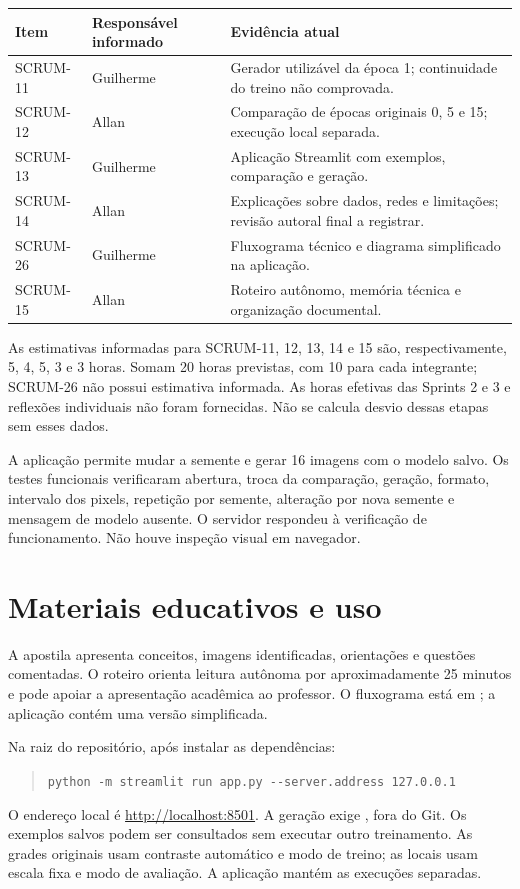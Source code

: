 \documentclass[12pt,a4paper]{article}
\begin{document}
\begin{center}
\small
\begin{tabularx}{\textwidth}{@{}lYY@{}}
\toprule
\textbf{Item} & \textbf{Responsável informado} & \textbf{Evidência atual} \\
\midrule
SCRUM-11 & Guilherme & Gerador utilizável da época 1; continuidade do treino não comprovada. \\
SCRUM-12 & Allan & Comparação de épocas originais 0, 5 e 15; execução local separada. \\
SCRUM-13 & Guilherme & Aplicação Streamlit com exemplos, comparação e geração. \\
SCRUM-14 & Allan & Explicações sobre dados, redes e limitações; revisão autoral final a registrar. \\
SCRUM-26 & Guilherme & Fluxograma técnico e diagrama simplificado na aplicação. \\
SCRUM-15 & Allan & Roteiro autônomo, memória técnica e organização documental. \\
\bottomrule
\end{tabularx}
\end{center}

As estimativas informadas para SCRUM-11, 12, 13, 14 e 15 são, respectivamente, 5, 4, 5, 3 e 3 horas. Somam 20 horas previstas, com 10 para cada integrante; SCRUM-26 não possui estimativa informada. As horas efetivas das Sprints 2 e 3 e reflexões individuais não foram fornecidas. Não se calcula desvio dessas etapas sem esses dados.

A aplicação permite mudar a semente e gerar 16 imagens com o modelo salvo. Os testes funcionais verificaram abertura, troca da comparação, geração, formato, intervalo dos pixels, repetição por semente, alteração por nova semente e mensagem de modelo ausente. O servidor respondeu à verificação de funcionamento. Não houve inspeção visual em navegador.

\section{Materiais educativos e uso}
A apostila  apresenta conceitos, imagens identificadas, orientações e questões comentadas. O roteiro  orienta leitura autônoma por aproximadamente 25 minutos e pode apoiar a apresentação acadêmica ao professor. O fluxograma está em ; a aplicação contém uma versão simplificada.

Na raiz do repositório, após instalar as dependências:
\begin{quote}
\small\verb|python -m streamlit run app.py --server.address 127.0.0.1|
\end{quote}
O endereço local é \url{http://localhost:8501}. A geração exige , fora do Git. Os exemplos salvos podem ser consultados sem executar outro treinamento. As grades originais usam contraste automático e modo de treino; as locais usam escala fixa e modo de avaliação. A aplicação mantém as execuções separadas.
\end{document}
